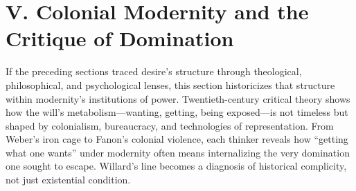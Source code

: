 \section*{V. Colonial Modernity and the Critique of Domination}
\label{sec:v-colonial-modernity}

If the preceding sections traced desire's structure through theological, philosophical, and
psychological lenses, this section historicizes that structure within modernity's institutions
of power. Twentieth-century critical theory shows how the will's metabolism---wanting, getting,
being exposed---is not timeless but shaped by colonialism, bureaucracy, and technologies of
representation. From Weber's iron cage to Fanon's colonial violence, each thinker reveals how
``getting what one wants'' under modernity often means internalizing the very domination one
sought to escape. Willard's line becomes a diagnosis of historical complicity, not just
existential condition.


\pagebreak[2]

\pagebreak[2]

\pagebreak[2]

\pagebreak[2]

\pagebreak[2]

